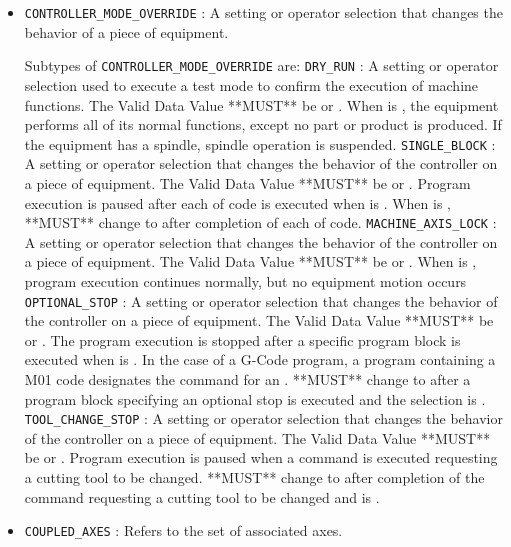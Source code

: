 \begin{itemize}
\item \texttt{CONTROLLER_MODE_OVERRIDE} : A setting or operator selection that changes the behavior of a piece of equipment. 

Subtypes of \texttt{CONTROLLER_MODE_OVERRIDE} are: 
\newline\tab \texttt{DRY_RUN} : A setting or operator selection used to execute a test mode to confirm the execution of machine functions. 
 The \gls{Valid Data Value} **MUST** be  or . 
 When  is , the equipment performs all of its normal functions, except no part or product is produced.  If the equipment has a spindle, spindle operation is suspended. 
\newline\tab \texttt{SINGLE_BLOCK} : A setting or operator selection that changes the behavior of the controller on a piece of equipment. 
 The \gls{Valid Data Value} **MUST** be  or .
 Program execution is paused after each  of code is executed when  is .   
 When  is ,  **MUST** change to  after completion of each  of code.  
\newline\tab \texttt{MACHINE_AXIS_LOCK} : A setting or operator selection that changes the behavior of the controller on a piece of equipment. 
 The \gls{Valid Data Value} **MUST** be  or . 
 When  is , program execution continues normally, but no equipment motion occurs  
\newline\tab \texttt{OPTIONAL_STOP} : A setting or operator selection that changes the behavior of the controller on a piece of equipment. 
 The \gls{Valid Data Value} **MUST** be  or .
 The program execution is stopped after a specific program block is executed when  is .    
 In the case of a G-Code program, a program  containing a M01 code designates the command for an . 
  **MUST** change to  after a program block specifying an optional stop is executed and the  selection is . 
\newline\tab \texttt{TOOL_CHANGE_STOP} : A setting or operator selection that changes the behavior of the controller on a piece of equipment. 
 The \gls{Valid Data Value} **MUST** be  or . 
 Program execution is paused when a command is executed requesting a cutting tool to be changed. 
  **MUST** change to  after completion of the command requesting a cutting tool to be changed and  is . 
\item \texttt{COUPLED_AXES} : Refers to the set of associated axes. 


\end{itemize}
